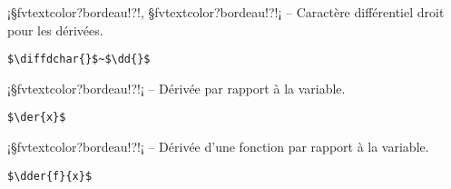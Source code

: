 \documentclass[11pt,a4paper,rgb]{report}
\begin{document}
\setlength{\leftskip}{0pt}
\setlength{\textwidth}{18cm}%


\vspace*{.75cm}

\inCodeStub¡§fvtextcolor?bordeau!?\diffdchar{}!, §fvtextcolor?bordeau!?\dd{}!¡ -- Caractère différentiel droit pour les dérivées.

\setlength{\leftskip}{.75cm}%
\setlength{\textwidth}{17.25cm}%

\colorbox{blue!15}{}
\hfill
\begin{minipage}{.65\textwidth}
	\begin{lstlisting}[linewidth=\textwidth, language={[LaTeX]TeX}]
	$\diffdchar{}$~$\dd{}$
	\end{lstlisting}
\end{minipage}

\setlength{\leftskip}{0pt}
\setlength{\textwidth}{18cm}%


\vspace*{.75cm}

\inCodeStub¡§fvtextcolor?bordeau!?!¡ -- Dérivée par rapport à la variable.

\setlength{\leftskip}{.75cm}%
\setlength{\textwidth}{17.25cm}%

\colorbox{blue!15}{}
\hfill
\begin{minipage}{.65\textwidth}
	\begin{lstlisting}[linewidth=\textwidth, language={[LaTeX]TeX}]
	$\der{x}$
	\end{lstlisting}
\end{minipage}

\setlength{\leftskip}{0pt}
\setlength{\textwidth}{18cm}%


\vspace*{.75cm}

\inCodeStub¡§fvtextcolor?bordeau!?!¡ -- Dérivée d'une fonction par rapport à la variable.

\setlength{\leftskip}{.75cm}%
\setlength{\textwidth}{17.25cm}%

\colorbox{blue!15}{}
\hfill
\begin{minipage}{.65\textwidth}
	\begin{lstlisting}[linewidth=\textwidth, language={[LaTeX]TeX}]
	$\dder{f}{x}$
	\end{lstlisting}
\end{minipage}
\end{document}
